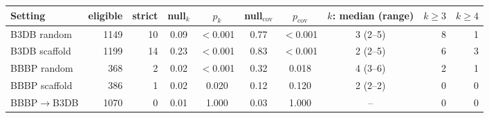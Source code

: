 \begin{tabular}{lrrcccccrr}
\toprule
Setting & eligible & strict & null$_k$ & $p_k$ & null$_{\mathrm{cov}}$ & $p_{\mathrm{cov}}$ & $k$: median (range) & $k\ge3$ & $k\ge4$\\
\midrule
B3DB random & 1149 & 10 & 0.09 & $<$0.001 & 0.77 & $<$0.001 & 3 (2--5) & 8 & 1\\
B3DB scaffold & 1199 & 14 & 0.23 & $<$0.001 & 0.83 & $<$0.001 & 2 (2--5) & 6 & 3\\
BBBP random & 368 & 2 & 0.02 & $<$0.001 & 0.32 & 0.018 & 4 (3--6) & 2 & 1\\
BBBP scaffold & 386 & 1 & 0.02 & 0.020 & 0.12 & 0.120 & 2 (2--2) & 0 & 0\\
BBBP$\to$B3DB & 1070 & 0 & 0.01 & 1.000 & 0.03 & 1.000 & -- & 0 & 0\\
\bottomrule
\end{tabular}
